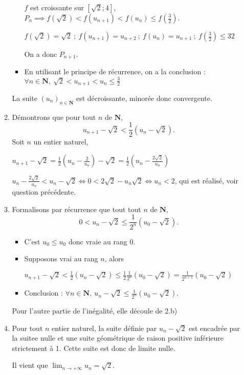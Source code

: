 \documentclass[a4paper,12pt,french]{article}
\newcommand{\N}{\mathbf{N}}
\begin{document}
\begin{Answer}[number=104]
\begin{enumerate}
\begin{enumerate}
\begin{itemize}
              $f$ est croissante sur $[\sqrt{2} ; 4]$, $P_n \implies
              f(\sqrt{2}) < f(u_{n+1}) < f(u_n) \leqslant
              f\left(\frac32\right)$.

              $f(\sqrt{2}) = \sqrt{2}\ ;\ f(u_{n+1}) = u_{n+2}\ ;\
              f(u_n) = u_{n+1}\ ;\ f\left(\frac32\right) \leqslant 32$

              On a donc $P_{n+1}$.
            \item En utilisant le principe de récurrence, on a la
              conclusion : $\forall n\in\N,\ \sqrt{2} < u_{n+1} < u_n
              \leqslant \frac32$
          \end{itemize}

          La suite $(u_n)_{n\in\N}$ est décroissante, minorée donc
          convergente.
        \item Démontrons que pour tout $n$ de $\N$, \[ u_{n+1} - \sqrt{2}
          < \frac12\left(u_n - \sqrt{2} \right).\]
          Soit $n$ un entier naturel,

          $u_{n+1} - \sqrt{2} = \frac12\left(u_n - \frac2{u_n} \right) -
          \sqrt{2} = \frac12\left(u_n - \frac{2\sqrt{2}}{u_n}\right)$

          $u_n -\frac{2\sqrt2}{u_n} < u_n - \sqrt2 \iff 0< 2\sqrt{2} -
          u_n\sqrt2 \iff u_n < 2$, qui est réalisé, voir question
          précédente.
        \item Formalisons par récurrence que tout tout $n$ de $\N$, \[ 0
            < u_n - \sqrt{2} \leqslant \frac1{2^n}\left(u_0 - \sqrt{2}
          \right). \]
          \begin{itemize}
            \item C'est $u_0 \leqslant u_0$ donc vraie au rang 0.
            \item Supposons vrai au rang $n$, alors

              $u_{n+1} - \sqrt{2} < \frac12 \left(u_n - \sqrt{2}\right)
              \leqslant \frac12 \frac1{2^n}\left(u_0 - \sqrt{2} \right)
              = \frac1{2^{n+1}}\left(u_0 - \sqrt{2} \right)$
            \item Conclusion : $\forall n\in\N,\ u_n - \sqrt{2}
              \leqslant \frac1{2^n}\left(u_0 - \sqrt{2} \right)$.
          \end{itemize}
          Pour l'autre partie de l'inégalité, elle découle de 2.b)
        \item Pour tout $n$ entier naturel, la suite définie par $u_n -
          \sqrt2$ est encadrée par la suitee nulle et une suite
          géométrique de raison positive inférieure strictement à 1.
          Cette suite est donc de limite nulle.

          Il vient que $\lim_{n\to+\infty}u_n = \sqrt2$.
      \end{enumerate}
  \end{enumerate}
\end{Answer}
\end{document}
